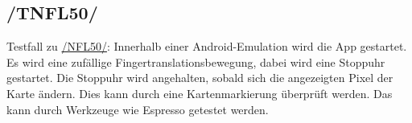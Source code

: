 \subsection*{/TNFL50/}

\label{/TNFL50/} Testfall zu \hyperref[/NFL50/]{/NFL50/}: Innerhalb einer \Gls{Android}-\Gls{Emulation} wird die App gestartet.
Es wird eine zufällige \Gls{Fingertranslationsbewegung}, dabei wird eine Stoppuhr gestartet.
Die Stoppuhr wird angehalten, sobald sich die angezeigten Pixel der Karte ändern.
Dies kann durch eine Kartenmarkierung überprüft werden.
Das kann durch Werkzeuge wie \Gls{Espresso} getestet werden.